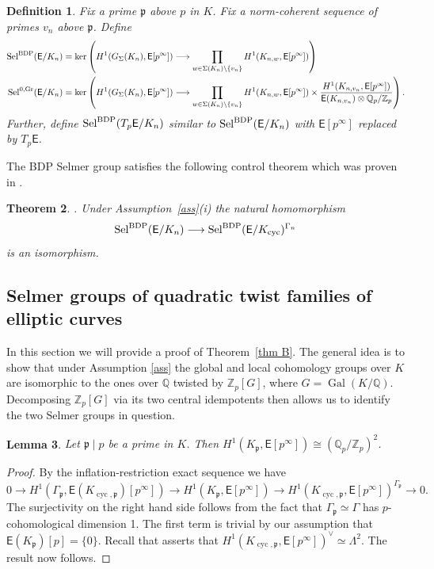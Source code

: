 \documentclass{amsart}
\newtheorem{theorem}{Theorem}[section]
\newtheorem{lemma}[theorem]{Lemma}
\newtheorem{definition}[theorem]{Definition}
\numberwithin{equation}{section}
\theoremstyle{remark}
\newcommand{\Gal}{\operatorname{Gal}}
\newcommand{\cyc}{\operatorname{cyc}}
\newcommand{\Sel}{\operatorname{Sel}}
\newcommand{\Gr}{\operatorname{Gr}}
\newcommand{\SelBDP}{\operatorname{Sel}^{\textup{BDP}}}
\newcommand{\Z}{\mathbb{Z}}
\newcommand{\Qp}{\mathbb{Q}_p}
\newcommand{\Q}{\mathbb{Q}}
\newcommand{\EC}{\mathsf{E}}
\newcommand{\fp}{\mathfrak{p}}
\theoremstyle{plain} %
\begin{document}
\begin{definition}
Fix a prime $\fp$ above $p$ in $K$.
Fix a norm-coherent sequence of primes $v_n$ above $\fp$.
Define
\begin{align*}
\SelBDP(\EC/K_n) &=\ker\left(H^1({G_{\Sigma}}(K_n),\EC[p^\infty])\longrightarrow \prod_{w\in \Sigma(K_n)\setminus \{v_n\}}H^1(K_{n,w},\EC[p^\infty])\right) \\
\Sel^{0,\Gr}(\EC/K_n)&=\ker\left(H^1({G_{\Sigma}}(K_n),\EC[p^\infty])\longrightarrow \prod_{w\in \Sigma(K_n)\setminus \{v_n\}}H^1(K_{n,w},\EC[p^\infty])\times \frac{H^1(K_{n,v_n},\EC[p^\infty])}{\EC(K_{n,v_n})\otimes \Q_p/\Z_p}\right).
\end{align*}
Further, define $\SelBDP(T_p\EC/K_n)$ similar to $\SelBDP(\EC/K_n)$ with $\EC[p^\infty]$ replaced by $T_p\EC$.
\end{definition}

The BDP Selmer group satisfies the following control theorem which was proven in \cite[Theorem~4.1]{lei-lim-m}.
\begin{theorem}.
\label{control-bdp-selmer}
Under Assumption~\ref{ass}\textup{(}i\textup{)} the natural homomorphism
\[
\SelBDP(\EC/K_n)\longrightarrow \SelBDP(\EC/K_{\cyc})^{\Gamma_n}
\]
is an isomorphism.
\end{theorem}

\subsection{Selmer groups of quadratic twist families of elliptic curves}
In this section we will provide a proof of Theorem~\ref{thm B}.
The general idea is to show that under Assumption \ref{ass} the global and local cohomology groups over $K$ are isomorphic to the ones over $\Q$ twisted by $\Z_p[G]$, where $G=\Gal(K/\Q)$.
Decomposing $\Z_p[G]$ via its two central idempotents then allows us to identify the two Selmer groups in question.

\begin{lemma}
Let $\fp\mid p$ be a prime in $K$.
Then $H^1(K_{\fp},\EC[p^\infty])\cong (\Qp/\Z_p)^2$.
\end{lemma}

\begin{proof}
By the inflation-restriction exact sequence we have
\[
0 \longrightarrow H^1(\Gamma_{\fp}, \EC(K_{\cyc,\fp})[p^\infty]) \longrightarrow H^1(K_{\fp},\EC[p^\infty]) \longrightarrow H^1(K_{\cyc,\fp}, \EC[p^\infty])^{\Gamma_{\fp}} \longrightarrow 0.
\]
The surjectivity on the right hand side follows from the fact that $\Gamma_{\fp} \simeq \Gamma$ has $p$-cohomological dimension 1.
The first term is trivial by our assumption that $\EC(K_\fp)[p]=\{0\}$.
Recall that \cite[Corollary~2]{greenberg} asserts that $H^1(K_{\cyc,\fp}, \EC[p^\infty])^\vee \simeq \Lambda^2$.
The result now follows.
\end{proof}
\end{document}
